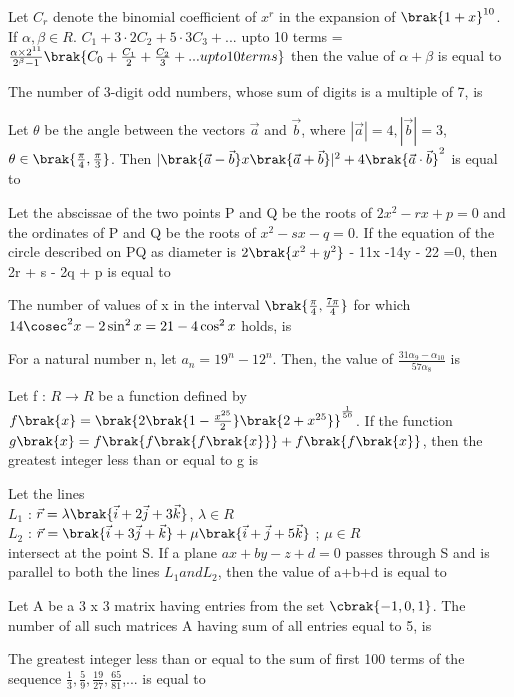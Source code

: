 \iffalse
\title{Assignment-4}
\author{EE24BTECH11048-NITHIN.K}
\section{integer}
\fi
\item Let $C_r$ denote the binomial coefficient of $x^r$ in the expansion of $\brak{1 + x}^{10}$. If $\alpha, \beta \in R$. $C_1 + 3\cdot2C_2 + 5\cdot3C_3 + ...$ upto 10 terms = $\frac{\alpha\times2^{11}}{2^{\beta} - 1}\brak{C_0 +\frac{C_1}{2} + \frac{C_2}{3} + ...upto 10 terms}$ then the value of $\alpha + \beta$ is equal to
\item The number of 3-digit odd numbers, whose sum of digits is a multiple of 7, is
\item Let $\theta$ be the angle between the vectors $\vec{a}$ and $\vec{b}$, where $|\vec{a}|=4,|\vec{b}|=3$, $\theta \in \brak{\frac{\pi}{4},\frac{\pi}{3}}$. Then $|\brak{\vec{a}-\vec{b}} x \brak{\vec{a}+\vec{b}}|^2 + 4\brak{\vec{a}\cdot\vec{b}}^2$ is equal to
\item Let the abscissae of the two points P and Q be the roots of $2x^2 - rx + p = 0$ and the ordinates of P and Q be the roots of $x^2-sx-q = 0$. If the equation of the circle described on PQ as diameter is $2\brak{x^2 + y^2}$ - 11x -14y - 22 =0, then 2r + s - 2q + p is equal to
\item The number of values of x in the interval $\brak{\frac{\pi}{4},\frac{7\pi}{4}}$ for which $14\cosec^2x - 2\sin^2x = 21 - 4\cos^2x$ holds, is
\item For a natural number n, let $a_n = 19^n - 12^n$. Then, the value of $\frac{31\alpha_9 -\alpha_10}{57\alpha_8}$ is
\item Let f : $R \rightarrow R$ be a function defined by $f\brak{x} = \brak{2\brak{1-\frac{x^{25}}{2}}\brak{2+x^{25}}}^{\frac{1}{50}}$. If the function $g\brak{x} = f\brak{f\brak{f\brak{x}}} + f\brak{f\brak{x}}$, then the greatest integer less than or equal to g is
\item Let the lines \\
	$L_1$ : $\vec{r} = \lambda\brak{\vec{i}+2\vec{j}+3\vec{k}}$, $\lambda \in R$ \\
	$L_2$ : $\vec{r} = \brak{\vec{i} + 3\vec{j} + \vec{k}} + \mu\brak{\vec{i} + \vec{j} +5\vec{k}}$ ; $\mu \in R$ \\
	intersect at the point S. If a plane $ax+by-z+d=0$ passes through S and is parallel to both the lines $L_1 andL_2$, then the value of a+b+d is equal to
\item Let A be a 3 x 3 matrix having entries from the set $\cbrak{-1,0,1}$. The number of all such matrices A having sum of all entries equal to 5, is
\item The greatest integer less than or equal to the sum of first 100 terms of the sequence $\frac{1}{3},\frac{5}{9},\frac{19}{27},\frac{65}{81}$,... is equal to
